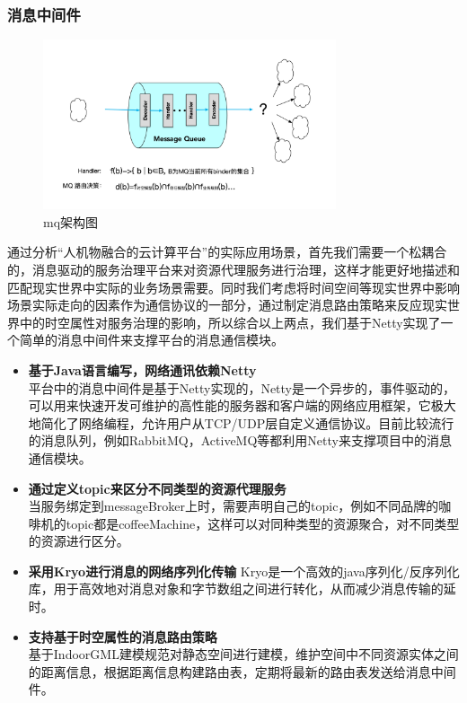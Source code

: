 \documentclass[a4paper, 12pt]{article}
\theoremstyle{definition}
\begin{document}
\subsubsection{消息中间件}
\begin{figure}[ht]
 \centering
 \includegraphics[height=5cm]{images/mq_architecture.jpg}
 \caption{mq架构图}
 \label{fig:singleblock}
\end{figure}
通过分析“人机物融合的云计算平台”的实际应用场景，首先我们需要一个松耦合的，消息驱动的服务治理平台来对资源代理服务进行治理，这样才能更好地描述和匹配现实世界中实际的业务场景需要。同时我们考虑将时间空间等现实世界中影响场景实际走向的因素作为通信协议的一部分，通过制定消息路由策略来反应现实世界中的时空属性对服务治理的影响，所以综合以上两点，我们基于Netty实现了一个简单的消息中间件来支撑平台的消息通信模块。

\begin{itemize}
    \item {\textbf{基于Java语言编写，网络通讯依赖Netty}}\\
    平台中的消息中间件是基于Netty实现的，Netty是一个异步的，事件驱动的，可以用来快速开发可维护的高性能的服务器和客户端的网络应用框架，它极大地简化了网络编程，允许用户从TCP/UDP层自定义通信协议。目前比较流行的消息队列，例如RabbitMQ，ActiveMQ等都利用Netty来支撑项目中的消息通信模块。
    \item {\textbf{通过定义topic来区分不同类型的资源代理服务}}\\
    当服务绑定到messageBroker上时，需要声明自己的topic，例如不同品牌的咖啡机的topic都是coffeeMachine，这样可以对同种类型的资源聚合，对不同类型的资源进行区分。
    \item {\textbf{采用Kryo进行消息的网络序列化传输}}
    Kryo是一个高效的java序列化/反序列化库，用于高效地对消息对象和字节数组之间进行转化，从而减少消息传输的延时。
    \item{\textbf{支持基于时空属性的消息路由策略}}\\
    基于IndoorGML建模规范对静态空间进行建模，维护空间中不同资源实体之间的距离信息，根据距离信息构建路由表，定期将最新的路由表发送给消息中间件。
\end{itemize}
\newpage
\end{document}
